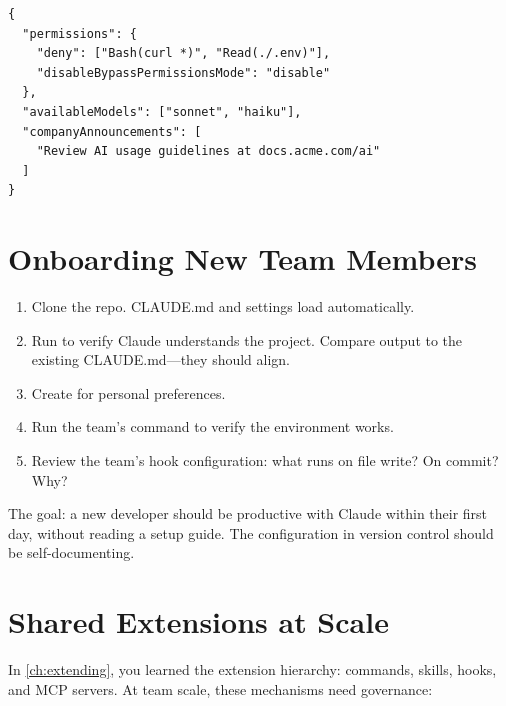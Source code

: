 \begin{verbatim}
{
  "permissions": {
    "deny": ["Bash(curl *)", "Read(./.env)"],
    "disableBypassPermissionsMode": "disable"
  },
  "availableModels": ["sonnet", "haiku"],
  "companyAnnouncements": [
    "Review AI usage guidelines at docs.acme.com/ai"
  ]
}
\end{verbatim}


\section{Onboarding New Team Members}
\label{sec:onboarding}


\begin{enumerate}
  \item Clone the repo. CLAUDE.md and settings load automatically.
  \item Run  to verify Claude understands the project.
    Compare output to the existing CLAUDE.md---they should align.
  \item Create  for personal preferences.
  \item Run the team's  command to verify the environment works.
  \item Review the team's hook configuration:
    what runs on file write? On commit? Why?
\end{enumerate}

The goal: a new developer should be productive with Claude
within their first day, without reading a setup guide.
The configuration in version control should be self-documenting.

\section{Shared Extensions at Scale}
\label{sec:shared-extensions}

In \cref{ch:extending}, you learned the extension hierarchy:
commands, skills, hooks, and MCP servers. At team scale, these
mechanisms need governance:

